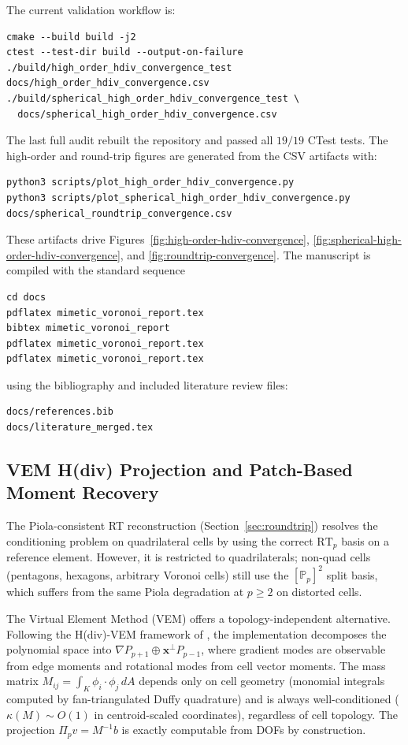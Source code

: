 \documentclass[11pt]{article}
\begin{document}
The current validation workflow is:
\begin{verbatim}
cmake --build build -j2
ctest --test-dir build --output-on-failure
./build/high_order_hdiv_convergence_test docs/high_order_hdiv_convergence.csv
./build/spherical_high_order_hdiv_convergence_test \
  docs/spherical_high_order_hdiv_convergence.csv
\end{verbatim}
The last full audit rebuilt the repository and passed all \(19/19\) CTest tests.
The high-order and round-trip figures are generated from the CSV artifacts with:
\begin{verbatim}
python3 scripts/plot_high_order_hdiv_convergence.py
python3 scripts/plot_spherical_high_order_hdiv_convergence.py
docs/spherical_roundtrip_convergence.csv
\end{verbatim}
These artifacts drive Figures~\ref{fig:high-order-hdiv-convergence},
\ref{fig:spherical-high-order-hdiv-convergence}, and
\ref{fig:roundtrip-convergence}.  The manuscript is compiled with the standard
sequence
\begin{verbatim}
cd docs
pdflatex mimetic_voronoi_report.tex
bibtex mimetic_voronoi_report
pdflatex mimetic_voronoi_report.tex
pdflatex mimetic_voronoi_report.tex
\end{verbatim}
using the bibliography and included literature review files:
\begin{verbatim}
docs/references.bib
docs/literature_merged.tex
\end{verbatim}

\subsection{VEM H(div) Projection and Patch-Based Moment Recovery}
\label{sec:vem-patch-recovery}

The Piola-consistent RT reconstruction (Section~\ref{sec:roundtrip}) resolves
the conditioning problem on quadrilateral cells by using the correct
\(\mathrm{RT}_p\) basis on a reference element.  However, it is restricted to
quadrilaterals; non-quad cells (pentagons, hexagons, arbitrary Voronoi cells)
still use the \([\mathbb{P}_p]^2\) split basis, which suffers from the same
Piola degradation at \(p\ge2\) on distorted cells.

The Virtual Element Method (VEM) offers a topology-independent alternative.
Following the H(div)-VEM framework of
\cite{BeiraoDaVeiga2016,BrezziFalkMarini2014,BeiraoDaVeigaMixed2016}, the
implementation decomposes the polynomial space into \(\nabla P_{p+1} \oplus
\mathbf{x}^{\perp} P_{p-1}\), where gradient modes are observable from edge
moments and rotational modes from cell vector moments.  The mass matrix
\(M_{ij}=\int_K \phi_i \cdot \phi_j\,dA\) depends only on cell geometry
(monomial integrals computed by fan-triangulated Duffy quadrature) and is always
well-conditioned (\(\kappa(M)\sim O(1)\) in centroid-scaled coordinates),
regardless of cell topology.  The projection \(\Pi_p v = M^{-1}b\) is exactly
computable from DOFs by construction.
\end{document}
